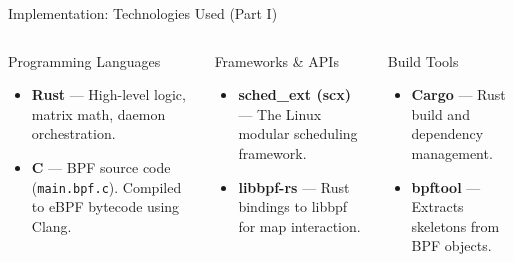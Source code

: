 \documentclass[aspectratio=169]{beamer}
\begin{document}
\begin{frame}{Implementation: Technologies Used (Part I)}
  \begin{columns}[T]
    
      \begin{block}{Programming Languages}
        \begin{itemize}\normalsize\itemsep5pt
          \item \textbf{Rust} — High-level logic, matrix math, daemon orchestration.
          \item \textbf{C} — BPF source code (\texttt{main.bpf.c}). Compiled to eBPF bytecode using Clang.
        \end{itemize}
      \end{block}
      
      \vspace{2pt}
      
      \begin{block}{Frameworks \& APIs}
        \begin{itemize}\normalsize\itemsep5pt
          \item \textbf{sched\_ext (scx)} — The Linux modular scheduling framework.
          \item \textbf{libbpf-rs} — Rust bindings to libbpf for map interaction.
        \end{itemize}
      \end{block}
    
      \begin{block}{Build Tools}
        \begin{itemize}\normalsize\itemsep5pt
          \item \textbf{Cargo} — Rust build and dependency management.
          \item \textbf{bpftool} — Extracts skeletons from BPF objects.
        \end{itemize}
      \end{block}

  \end{columns}
\end{frame}
\end{document}
